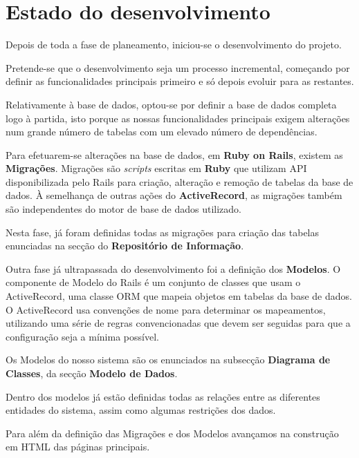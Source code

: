 \section{Estado do desenvolvimento}

Depois de toda a fase de planeamento, iniciou-se o desenvolvimento do projeto.

Pretende-se que o desenvolvimento seja um processo incremental, começando por definir as funcionalidades principais primeiro e só depois evoluir para as restantes.

Relativamente à base de dados, optou-se por definir a base de dados completa logo à partida, isto porque as nossas funcionalidades principais exigem alterações num grande número de tabelas com um elevado número de dependências.

Para efetuarem-se alterações na base de dados, em \textbf{Ruby on Rails}, existem as \textbf{Migrações}. Migrações são \textit{scripts} escritas em \textbf{Ruby} que utilizam API disponibilizada pelo Rails para criação, alteração e remoção de tabelas da base de dados. À semelhança de outras ações do \textbf{ActiveRecord}, as migrações também são independentes do motor de base de dados utilizado. 

Nesta fase, já foram definidas todas as migrações para criação das tabelas enunciadas na secção do \textbf{Repositório de Informação}.

Outra fase já ultrapassada do desenvolvimento foi a definição dos \textbf{Modelos}.
O componente de Modelo do Rails é um conjunto de classes que usam o ActiveRecord, uma classe ORM que mapeia objetos em tabelas da base de dados. O ActiveRecord usa convenções de nome para determinar os mapeamentos, utilizando uma série de regras convencionadas que devem ser seguidas para que a configuração seja a mínima possível.

Os Modelos do nosso sistema são os enunciados na subsecção \textbf{Diagrama de Classes}, da secção \textbf{Modelo de Dados}.

Dentro dos modelos já estão definidas todas as relações entre as diferentes entidades do sistema, assim como algumas restrições dos dados.

Para além da definição das Migrações e dos Modelos avançamos na construção em HTML das páginas principais.
